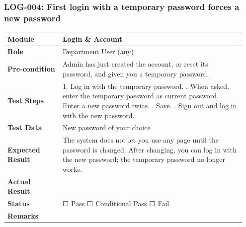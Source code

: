 \documentclass[10pt]{article}
\begin{document}
\subsubsection*{LOG-004: First login with a temporary password forces a new password}
\begin{longtable}{p{0.22\linewidth}p{0.73\linewidth}}
\hline
\textbf{Module} & Login \& Account \\ \hline
\textbf{Role} & Department User (any) \\ \hline
\textbf{Pre-condition} & Admin has just created the account, or reset its password, and given you a temporary password. \\ \hline
\textbf{Test Steps} & 1. Log in with the temporary password. \newline 2. When asked, enter the temporary password as current password. \newline 3. Enter a new password twice. \newline 4. Save. \newline 5. Sign out and log in with the new password. \\ \hline
\textbf{Test Data} & New password of your choice \\ \hline
\textbf{Expected Result} & The system does not let you use any page until the password is changed. After changing, you can log in with the new password; the temporary password no longer works. \\ \hline
\textbf{Actual Result} & \newline \newline \\ \hline
\textbf{Status} & ☐ Pass \quad ☐ Conditional Pass \quad ☐ Fail \\ \hline
\textbf{Remarks} & \newline \\ \hline
\end{longtable}
\end{document}

